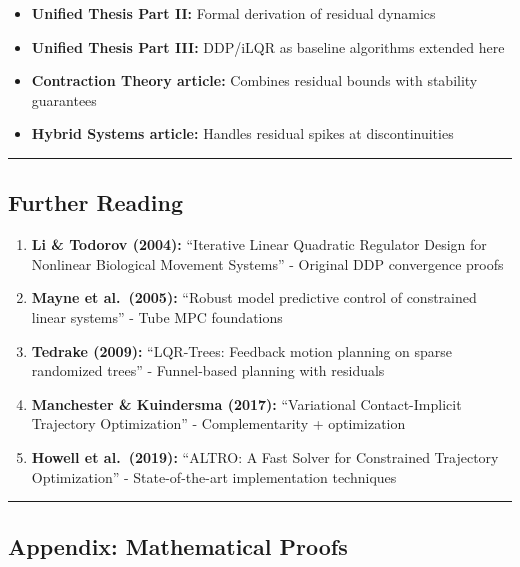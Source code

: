 \documentclass[
  letterpaper,
  DIV=11,
  numbers=noendperiod]{scrartcl}
\providecommand{\tightlist}{%
  \setlength{\itemsep}{0pt}\setlength{\parskip}{0pt}}\usepackage{longtable,booktabs,array}
\begin{document}
\begin{itemize}
\tightlist
\item
  \textbf{Unified Thesis Part II:} Formal derivation of residual
  dynamics
\item
  \textbf{Unified Thesis Part III:} DDP/iLQR as baseline algorithms
  extended here
\item
  \textbf{Contraction Theory article:} Combines residual bounds with
  stability guarantees
\item
  \textbf{Hybrid Systems article:} Handles residual spikes at
  discontinuities
\end{itemize}

\begin{center}\rule{0.5\linewidth}{0.5pt}\end{center}

\subsection{Further Reading}\label{further-reading}

\begin{enumerate}
\def\labelenumi{\arabic{enumi}.}
\tightlist
\item
  \textbf{Li \& Todorov (2004):} ``Iterative Linear Quadratic Regulator
  Design for Nonlinear Biological Movement Systems'' - Original DDP
  convergence proofs
\item
  \textbf{Mayne et al.~(2005):} ``Robust model predictive control of
  constrained linear systems'' - Tube MPC foundations
\item
  \textbf{Tedrake (2009):} ``LQR-Trees: Feedback motion planning on
  sparse randomized trees'' - Funnel-based planning with residuals
\item
  \textbf{Manchester \& Kuindersma (2017):} ``Variational
  Contact-Implicit Trajectory Optimization'' - Complementarity +
  optimization
\item
  \textbf{Howell et al.~(2019):} ``ALTRO: A Fast Solver for Constrained
  Trajectory Optimization'' - State-of-the-art implementation techniques
\end{enumerate}

\begin{center}\rule{0.5\linewidth}{0.5pt}\end{center}

\subsection{Appendix: Mathematical
Proofs}\label{appendix-mathematical-proofs}
\end{document}
